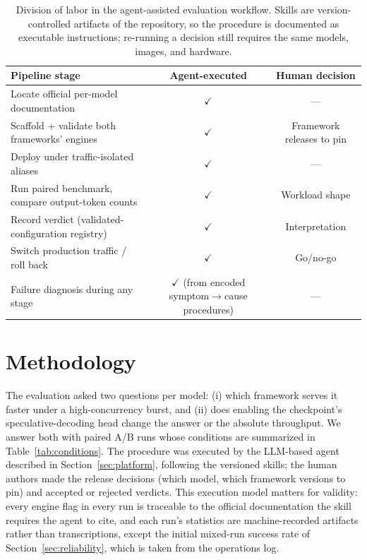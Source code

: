 \documentclass[11pt]{article}
\begin{document}
\begin{table}[t]
\centering
\small
\begin{tabularx}{\textwidth}{Xcc}
\toprule
\textbf{Pipeline stage} & \textbf{Agent-executed} & \textbf{Human decision} \\
\midrule
Locate official per-model documentation & $\checkmark$ & --- \\
Scaffold + validate both frameworks' engines & $\checkmark$ & Framework releases to pin \\
Deploy under traffic-isolated aliases & $\checkmark$ & --- \\
Run paired benchmark, compare output-token counts & $\checkmark$ & Workload shape \\
Record verdict (validated-configuration registry) & $\checkmark$ & Interpretation \\
Switch production traffic / roll back & $\checkmark$ & Go/no-go \\
Failure diagnosis during any stage & $\checkmark$ (from encoded symptom$\rightarrow$cause procedures) & --- \\
\bottomrule
\end{tabularx}
\caption{Division of labor in the agent-assisted evaluation workflow. Skills are version-controlled artifacts of the repository, so the procedure is documented as executable instructions; re-running a decision still requires the same models, images, and hardware.}
\label{tab:labor}
\end{table}

\section{Methodology}
\label{sec:method}

The evaluation asked two questions per model: (i) which framework serves it faster under a high-concurrency burst, and (ii) does enabling the checkpoint's speculative-decoding head change the answer or the absolute throughput. We answer both with paired A/B runs whose conditions are summarized in Table~\ref{tab:conditions}. The procedure was executed by the LLM-based agent described in Section~\ref{sec:platform}, following the versioned skills; the human authors made the release decisions (which model, which framework versions to pin) and accepted or rejected verdicts. This execution model matters for validity: every engine flag in every run is traceable to the official documentation the skill requires the agent to cite, and each run's statistics are machine-recorded artifacts rather than transcriptions, except the initial mixed-run success rate of Section~\ref{sec:reliability}, which is taken from the operations log.
\end{document}
